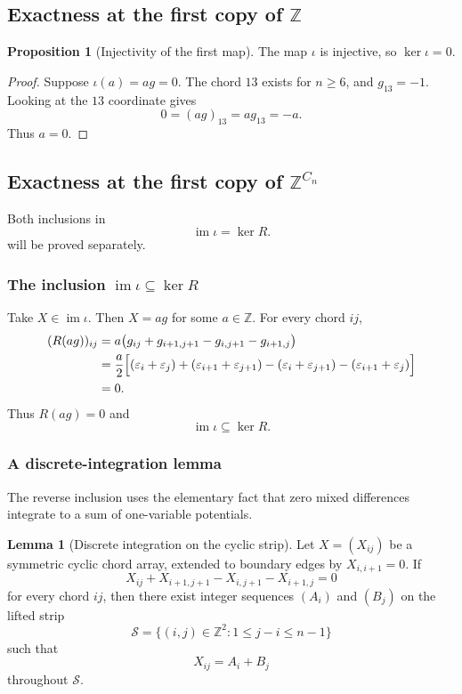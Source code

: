 \documentclass[11pt]{article}
\theoremstyle{definition}
\newtheorem*{innerlemma}{Lemma}
\newtheorem*{innerproposition}{Proposition}
\newcommand{\Z}{\mathbb Z}
\newcommand{\im}{\operatorname{im}}
\begin{document}
\subsection{Exactness at the first copy of \texorpdfstring{$\Z$}{Z}}

\begin{innerproposition}[Injectivity of the first map]
The map $\iota$ is injective, so $\ker\iota=0$.
\end{innerproposition}

\begin{proof}
Suppose $\iota(a)=ag=0$.  The chord $13$ exists for $n\geq6$, and
$g_{13}=-1$.  Looking at the $13$ coordinate gives
\[
 0=(ag)_{13}=a g_{13}=-a.
\]
Thus $a=0$.
\end{proof}

\subsection{Exactness at the first copy of \texorpdfstring{$\Z^{C_n}$}{Z(Cn)}}

Both inclusions in
\[
 \im\iota=\ker R.
\]
will be proved separately.

\subsubsection{The inclusion \texorpdfstring{$\im\iota\subseteq\ker R$}{im(iota) contained in ker(R)}}

Take $X\in\im\iota$.  Then $X=ag$ for some $a\in\Z$.  For every chord
$ij$,
\begin{align*}
(R(ag))_{ij}
 &=a\bigl(g_{ij}+g_{i+1,j+1}-g_{i,j+1}-g_{i+1,j}\bigr)\\
 &=\frac a2\Bigl[
 (\varepsilon_i+\varepsilon_j)+(\varepsilon_{i+1}+\varepsilon_{j+1})
 -(\varepsilon_i+\varepsilon_{j+1})-(\varepsilon_{i+1}+\varepsilon_j)
 \Bigr]\\
 &=0.
\end{align*}
Thus $R(ag)=0$ and
\[
 \im\iota\subseteq\ker R.
\]

\subsubsection{A discrete-integration lemma}

The reverse inclusion uses the elementary fact that zero mixed differences
integrate to a sum of one-variable potentials.

\begin{innerlemma}[Discrete integration on the cyclic strip]
Let $X=(X_{ij})$ be a symmetric cyclic chord array, extended to boundary
edges by $X_{i,i+1}=0$.  If
\[
 X_{ij}+X_{i+1,j+1}-X_{i,j+1}-X_{i+1,j}=0
\]
for every chord $ij$, then there exist integer sequences $(A_i)$ and $(B_j)$
on the lifted strip
\[
 \mathcal S=\{(i,j)\in\Z^2:1\leq j-i\leq n-1\}
\]
such that
\[
 X_{ij}=A_i+B_j
\]
throughout $\mathcal S$.
\end{innerlemma}
\end{document}
